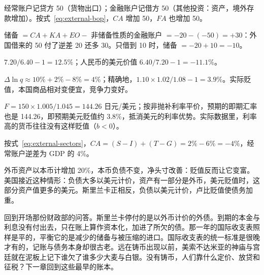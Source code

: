 \begin{answers}
\item 经常账户记贷方 50（货物出口）；金融账户记借方 50（其他投资：资产，境外存款增加）。按式~\eqref{eq:external-bop}，$\mathit{CA}$ 增加 50，$\mathit{FA}$ 也增加 50。
\item 储备 $= \mathit{CA}+\mathit{KA}+\mathit{EO}-$ 非储备性质的金融账户 $=-20-(-50)=+30$：外国借来的 50 付了逆差 20 还多 30。只借到 10 时，储备 $=-20+10=-10$。
\item $7.20/6.40-1=12.5\%$；人民币的美元价值 $6.40/7.20-1=-11.1\%$。
\item $\Delta\ln q\approx10\%+2\%-8\%=4\%$；精确地，$1.10\times1.02/1.08-1=3.9\%$。实际贬值，本国商品相对变便宜，竞争力变好。
\item $F=150\times1.005/1.045=144.26$ 日元/美元；按非抛补利率平价，预期的即期汇率也是 144.26，即预期美元贬值约 3.8\%，抵消美元的利率优势。实际数据里，利率高的货币往往没有这样贬值（$b<0$）。
\item 按式~\eqref{eq:external-sectors}，$\mathit{CA}=(S-I)+(T-G)=2\%-6\%=-4\%$，经常账户逆差为 GDP 的 4\%。
\item 外币资产以本币计增加 20\%，本币负债不变，净头寸改善：贬值反而让它变富。美国接近这种情形：负债大多以美元计价，资产有一部分是外币，美元贬值时，这部分资产值更多的美元\cite{gourinchas2005}。斯里兰卡正相反，负债以美元计价，卢比贬值使债务加重。
\end{answers}

回到开场那份财政部的问答。斯里兰卡停付的是以外币计价的外债。到期的本金与利息没有付出去，只在账上算作资本化，加进了所欠的债。那一年的国际收支表照样是平的，平衡它的是减少的储备与被压缩的进口。国际收支表的统一标准是很晚才有的，记账与债务本身却很古老。远在铸币出现以前，美索不达米亚的神庙与宫廷就在泥板上记下谁欠了谁多少大麦与白银。没有铸币，人们靠什么定价、放贷和征税？下一章回到这些最早的账本。
